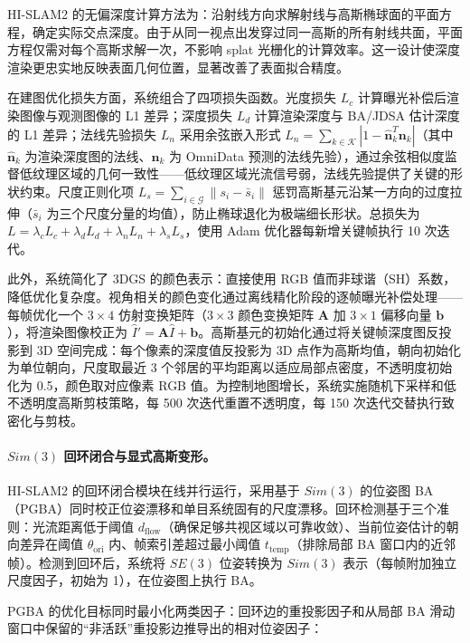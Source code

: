 HI-SLAM2 的无偏深度计算方法为：沿射线方向求解射线与高斯椭球面的平面方程，确定实际交点深度。由于从同一视点出发穿过同一高斯的所有射线共面，平面方程仅需对每个高斯求解一次，不影响 splat 光栅化的计算效率。这一设计使深度渲染更忠实地反映表面几何位置，显著改善了表面拟合精度。

在建图优化损失方面，系统组合了四项损失函数。光度损失 $L_c$ 计算曝光补偿后渲染图像与观测图像的 L1 差异；深度损失 $L_d$ 计算渲染深度与 BA/JDSA 估计深度的 L1 差异；法线先验损失 $L_n$ 采用余弦嵌入形式 $L_n = \sum_{k \in \mathcal{K}} |1 - \hat{\mathbf{n}}_k^T \mathbf{n}_k|$（其中 $\hat{\mathbf{n}}_k$ 为渲染深度图的法线、$\mathbf{n}_k$ 为 OmniData 预测的法线先验），通过余弦相似度监督低纹理区域的几何一致性——低纹理区域光流信号弱，法线先验提供了关键的形状约束。尺度正则化项 $L_s = \sum_{i \in \mathcal{G}} \| s_i - \bar{s}_i \|$ 惩罚高斯基元沿某一方向的过度拉伸（$\bar{s}_i$ 为三个尺度分量的均值），防止椭球退化为极端细长形状。总损失为 $L = \lambda_c L_c + \lambda_d L_d + \lambda_n L_n + \lambda_s L_s$，使用 Adam 优化器每新增关键帧执行 10 次迭代。

此外，系统简化了 3DGS 的颜色表示：直接使用 RGB 值而非球谐（SH）系数，降低优化复杂度。视角相关的颜色变化通过离线精化阶段的逐帧曝光补偿处理——每帧优化一个 $3{\times}4$ 仿射变换矩阵（$3{\times}3$ 颜色变换矩阵 $\mathbf{A}$ 加 $3{\times}1$ 偏移向量 $\mathbf{b}$），将渲染图像校正为 $\hat{I}' = \mathbf{A}\hat{I} + \mathbf{b}$。高斯基元的初始化通过将关键帧深度图反投影到 3D 空间完成：每个像素的深度值反投影为 3D 点作为高斯均值，朝向初始化为单位朝向，尺度取最近 3 个邻居的平均距离以适应局部点密度，不透明度初始化为 0.5，颜色取对应像素 RGB 值。为控制地图增长，系统实施随机下采样和低不透明度高斯剪枝策略，每 500 次迭代重置不透明度，每 150 次迭代交替执行致密化与剪枝。

\paragraph{$Sim(3)$ 回环闭合与显式高斯变形。}
HI-SLAM2 的回环闭合模块在线并行运行，采用基于 $Sim(3)$ 的位姿图 BA（PGBA）同时校正位姿漂移和单目系统固有的尺度漂移。回环检测基于三个准则：光流距离低于阈值 $d_{\mathrm{flow}}$（确保足够共视区域以可靠收敛）、当前位姿估计的朝向差异在阈值 $\theta_{\mathrm{ori}}$ 内、帧索引差超过最小阈值 $t_{\mathrm{temp}}$（排除局部 BA 窗口内的近邻帧）。检测到回环后，系统将 $SE(3)$ 位姿转换为 $Sim(3)$ 表示（每帧附加独立尺度因子，初始为 1），在位姿图上执行 BA。

PGBA 的优化目标同时最小化两类因子：回环边的重投影因子和从局部 BA 滑动窗口中保留的``非活跃''重投影边推导出的相对位姿因子：

